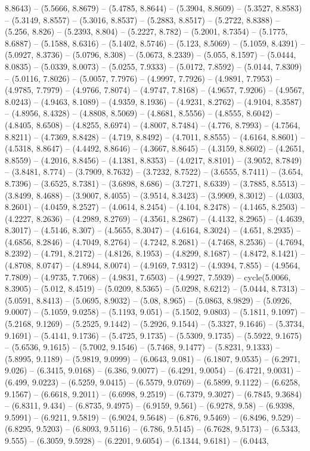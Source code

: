 8.8643) -- (5.5666, 8.8679) -- (5.4785, 8.8644) -- (5.3904, 8.8609) -- (5.3527, 8.8583) -- (5.3149, 8.8557) -- (5.3016, 8.8537) -- (5.2883, 8.8517) -- (5.2722, 8.8388) -- (5.256, 8.826) -- (5.2393, 8.804) -- (5.2227, 8.782) -- (5.2001, 8.7354) -- (5.1775, 8.6887) -- (5.1588, 8.6316) -- (5.1402, 8.5746) -- (5.123, 8.5069) -- (5.1059, 8.4391) -- (5.0927, 8.3736) -- (5.0796, 8.308) -- (5.0673, 8.2339) -- (5.055, 8.1597) -- (5.0444, 8.0835) -- (5.0339, 8.0073) -- (5.0255, 7.9333) -- (5.0172, 7.8592) -- (5.0144, 7.8309) -- (5.0116, 7.8026) -- (5.0057, 7.7976) -- (4.9997, 7.7926) -- (4.9891, 7.7953) -- (4.9785, 7.7979) -- (4.9766, 7.8074) -- (4.9747, 7.8168) -- (4.9657, 7.9206) -- (4.9567, 8.0243) -- (4.9463, 8.1089) -- (4.9359, 8.1936) -- (4.9231, 8.2762) -- (4.9104, 8.3587) -- (4.8956, 8.4328) -- (4.8808, 8.5069) -- (4.8681, 8.5556) -- (4.8555, 8.6042) -- (4.8405, 8.6508) -- (4.8255, 8.6974) -- (4.8007, 8.7484) -- (4.776, 8.7993) -- (4.7564, 8.8211) -- (4.7369, 8.8428) -- (4.719, 8.8492) -- (4.7011, 8.8555) -- (4.6164, 8.8601) -- (4.5318, 8.8647) -- (4.4492, 8.8646) -- (4.3667, 8.8645) -- (4.3159, 8.8602) -- (4.2651, 8.8559) -- (4.2016, 8.8456) -- (4.1381, 8.8353) -- (4.0217, 8.8101) -- (3.9052, 8.7849) -- (3.8481, 8.774) -- (3.7909, 8.7632) -- (3.7232, 8.7522) -- (3.6555, 8.7411) -- (3.654, 8.7396) -- (3.6525, 8.7381) -- (3.6898, 8.686) -- (3.7271, 8.6339) -- (3.7885, 8.5513) -- (3.8499, 8.4688) -- (3.9007, 8.4055) -- (3.9514, 8.3423) -- (3.9909, 8.3012) -- (4.0303, 8.2601) -- (4.0459, 8.2527) -- (4.0614, 8.2454) -- (4.104, 8.2478) -- (4.1465, 8.2503) -- (4.2227, 8.2636) -- (4.2989, 8.2769) -- (4.3561, 8.2867) -- (4.4132, 8.2965) -- (4.4639, 8.3017) -- (4.5146, 8.307) -- (4.5655, 8.3047) -- (4.6164, 8.3024) -- (4.651, 8.2935) -- (4.6856, 8.2846) -- (4.7049, 8.2764) -- (4.7242, 8.2681) -- (4.7468, 8.2536) -- (4.7694, 8.2392) -- (4.791, 8.2172) -- (4.8126, 8.1953) -- (4.8299, 8.1687) -- (4.8472, 8.1421) -- (4.8708, 8.0747) -- (4.8944, 8.0074) -- (4.9169, 7.9312) -- (4.9394, 7.855) -- (4.9564, 7.7809) -- (4.9735, 7.7068) -- (4.9831, 7.6503) -- (4.9927, 7.5939) -- cycle(5.0066, 8.3905) -- (5.012, 8.4519) -- (5.0209, 8.5365) -- (5.0298, 8.6212) -- (5.0444, 8.7313) -- (5.0591, 8.8413) -- (5.0695, 8.9032) -- (5.08, 8.965) -- (5.0863, 8.9829) -- (5.0926, 9.0007) -- (5.1059, 9.0258) -- (5.1193, 9.051) -- (5.1502, 9.0803) -- (5.1811, 9.1097) -- (5.2168, 9.1269) -- (5.2525, 9.1442) -- (5.2926, 9.1544) -- (5.3327, 9.1646) -- (5.3734, 9.1691) -- (5.4141, 9.1736) -- (5.4725, 9.1735) -- (5.5309, 9.1735) -- (5.5922, 9.1675) -- (5.6536, 9.1615) -- (5.7002, 9.1546) -- (5.7468, 9.1477) -- (5.8231, 9.1333) -- (5.8995, 9.1189) -- (5.9819, 9.0999) -- (6.0643, 9.081) -- (6.1807, 9.0535) -- (6.2971, 9.026) -- (6.3415, 9.0168) -- (6.386, 9.0077) -- (6.4291, 9.0054) -- (6.4721, 9.0031) -- (6.499, 9.0223) -- (6.5259, 9.0415) -- (6.5579, 9.0769) -- (6.5899, 9.1122) -- (6.6258, 9.1567) -- (6.6618, 9.2011) -- (6.6998, 9.2519) -- (6.7379, 9.3027) -- (6.7845, 9.3684) -- (6.8311, 9.434) -- (6.8735, 9.4975) -- (6.9159, 9.561) -- (6.9278, 9.58) -- (6.9398, 9.5991) -- (6.9211, 9.5819) -- (6.9024, 9.5648) -- (6.876, 9.5469) -- (6.8496, 9.529) -- (6.8295, 9.5203) -- (6.8093, 9.5116) -- (6.786, 9.5145) -- (6.7628, 9.5173) -- (6.5343, 9.555) -- (6.3059, 9.5928) -- (6.2201, 9.6054) -- (6.1344, 9.6181) -- (6.0443, 
